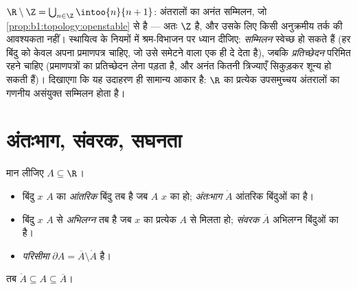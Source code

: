 \begin{example}[अनंत टुकड़ों से बना एक विवृत समुच्चय]\label{ex:b1:topology:rminusz}
$\R \setminus \Z = \bigcup_{n \in \Z} \intoo{n}{n+1}$:  अंतरालों का
अनंत सम्मिलन, जो \cref{prop:b1:topology:openstable} से  है --- अतः $\Z$
 है, और उसके लिए किसी अनुक्रमीय तर्क की आवश्यकता नहीं। स्थायित्व के
नियमों में श्रम-विभाजन पर ध्यान दीजिए: \emph{सम्मिलन} स्वेच्छ हो सकते हैं
(हर बिंदु को केवल अपना प्रमाणपत्र चाहिए, जो उसे समेटने वाला एक ही  दे
देता है), जबकि \emph{प्रतिच्छेदन} परिमित रहने चाहिए (प्रमाणपत्रों का
प्रतिच्छेदन लेना पड़ता है, और अनंत कितनी त्रिज्याएँ सिकुड़कर शून्य हो सकती
हैं)।  दिखाएगा कि यह उदाहरण ही सामान्य आकार है:
$\R$ का प्रत्येक  उपसमुच्चय  अंतरालों का गणनीय असंयुक्त सम्मिलन
होता है।
\end{example}

\section{अंतःभाग, संवरक, सघनता}

\begin{definition}[अंतःभाग, संवरक, परिसीमा]\label{def:b1:topology:closure}
मान लीजिए $A \subseteq \R$।
\begin{itemize}
  \item बिंदु $x$ $A$ का \emph{आंतरिक} बिंदु तब है जब $A$ $x$ का 
  हो; \emph{अंतःभाग} $\mathring{A}$ आंतरिक बिंदुओं का 
  है।
  \item बिंदु $x$ $A$ से \emph{अभिलग्न} तब है जब $x$ का प्रत्येक 
  $A$ से मिलता हो; \emph{संवरक} $\overline{A}$ अभिलग्न बिंदुओं
  का  है।
  \item \emph{परिसीमा} $\partial A = \overline A \setminus \mathring A$
  है।
\end{itemize}
तब $\mathring A \subseteq A \subseteq \overline A$।
\end{definition}

